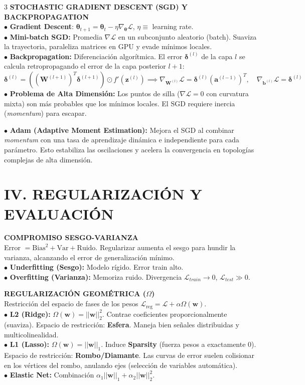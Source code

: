 \documentclass[8pt,a4paper,landscape,fleqn]{extarticle}
\begin{document}
\begin{multicols*}{3}
\textbf{STOCHASTIC GRADIENT DESCENT (SGD) Y BACKPROPAGATION}\\
$\bullet$ \textbf{Gradient Descent}: $\bm{\theta}_{t+1} = \bm{\theta}_t - \eta \nabla_{\bm{\theta}} \mathcal{L}$, $\eta \equiv$ learning rate.\\
$\bullet$ \textbf{Mini-batch SGD:} Promedia $\nabla \mathcal{L}$ en un subconjunto aleatorio (batch). Suaviza la trayectoria, paraleliza matrices en GPU y evade mínimos locales.\\
$\bullet$ \textbf{Backpropagation:} Diferenciación algorítmica. El error $\bm{\delta}^{(l)}$ de la capa $l$ se calcula retropropagando el error de la capa posterior $l+1$:
$$ \bm{\delta}^{(l)} = \left( (\bm{W}^{(l+1)})^T \bm{\delta}^{(l+1)} \right) \odot f'(\bm{z}^{(l)}) \implies \nabla_{\bm{W}^{(l)}}\mathcal{L} = \bm{\delta}^{(l)} (\bm{a}^{(l-1)})^T, \quad \nabla_{\bm{b}^{(l)}}\mathcal{L} = \bm{\delta}^{(l)} $$
$\bullet$ \textbf{Problema de Alta Dimensión:} Los puntos de silla ($\nabla \mathcal{L}=0$ con curvatura mixta) son más probables que los mínimos locales. El SGD requiere inercia (\textit{momentum}) para escapar.

$\bullet$ \textbf{Adam (Adaptive Moment Estimation):} Mejora el SGD al combinar \textit{momentum} con una tasa de aprendizaje dinámica e independiente para cada parámetro. Esto estabiliza las oscilaciones y acelera la convergencia en topologías complejas de alta dimensión.

\section{IV. REGULARIZACIÓN Y EVALUACIÓN}

\textbf{COMPROMISO SESGO-VARIANZA}\\
Error $= \text{Bias}^2 + \text{Var} + \text{Ruido}$. Regularizar aumenta el sesgo para hundir la varianza, alcanzando el error de generalización mínimo.\\
$\bullet$ \textbf{Underfitting (Sesgo):} Modelo rígido. Error train alto.\\
$\bullet$ \textbf{Overfitting (Varianza):} Memoriza ruido. Divergencia $\mathcal{L}_{train} \to 0$, $\mathcal{L}_{test} \gg 0$.

\textbf{REGULARIZACIÓN GEOMÉTRICA ($\Omega$)}\\
Restricción del espacio de fases de los pesos $\mathcal{L}_{\text{reg}} = \mathcal{L} + \alpha \Omega(\bm{w})$.\\
$\bullet$ \textbf{L2 (Ridge):} $\Omega(\bm{w}) = ||\bm{w}||_2^2$. Contrae coeficientes proporcionalmente (suaviza). Espacio de restricción: \textbf{Esfera}. Maneja bien señales distribuidas y multicolinealidad.\\
$\bullet$ \textbf{L1 (Lasso):} $\Omega(\bm{w}) = ||\bm{w}||_1$. Induce \textbf{Sparsity} (fuerza pesos a exactamente 0). Espacio de restricción: \textbf{Rombo/Diamante}. Las curvas de error suelen colisionar en los vértices del rombo, anulando ejes (selección de variables automática).\\
$\bullet$ \textbf{Elastic Net:} Combinación $\alpha_1 ||\bm{w}||_1 + \alpha_2 ||\bm{w}||_2^2$.


\end{multicols*}
\end{document}
